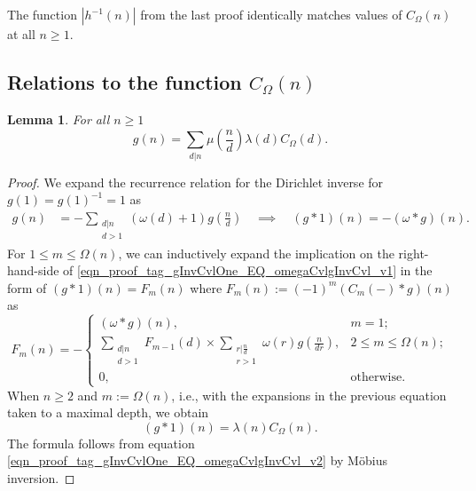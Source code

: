 \documentclass[11pt,reqno,a4letter]{article}
\numberwithin{equation}{section}
\numberwithin{figure}{section}
\numberwithin{table}{section}
\theoremstyle{plain}
\newtheorem{lemma}[theorem]{Lemma}
\numberwithin{theorem}{section}
\theoremstyle{definition}
\begin{document}
The function $|h^{-1}(n)|$ from the last proof identically matches  
values of $C_{\Omega}(n)$ at all $n \geq 1$. 

\subsection{Relations to the function $C_{\Omega}(n)$} 
\label{Section_InvFunc_PreciseExpsAndAsymptotics} 
\label{subSection_Relating_CknFuncs_to_gInvn} 

\begin{lemma} 
\label{lemma_AnExactFormulaFor_gInvByMobiusInv_v1} 
For all $n \geq 1$ 
\[
g(n) = \sum_{d|n} \mu\left(\frac{n}{d}\right) \lambda(d) C_{\Omega}(d). 
\]
\end{lemma}
\begin{proof} 
We expand the recurrence relation for the Dirichlet inverse 
for $g(1) = g(1)^{-1} = 1$ as 
\begin{align} 
\label{eqn_proof_tag_gInvCvlOne_EQ_omegaCvlgInvCvl_v1} 
g(n) & = - \sum_{\substack{d|n \\ d>1}} (\omega(d) + 1) g\left(\frac{n}{d}\right) 
     \quad\implies\quad 
     (g \ast 1)(n) = -(\omega \ast g)(n). 
\end{align} 
For $1 \leq m \leq \Omega(n)$, we can inductively expand the 
implication on the right-hand-side of \eqref{eqn_proof_tag_gInvCvlOne_EQ_omegaCvlgInvCvl_v1} 
in the form of $(g \ast 1)(n) = F_m(n)$ where 
$F_m(n) := (-1)^{m} (C_m(-) \ast g)(n)$ as 
\[
F_m(n) = - 
     \begin{cases} 
     (\omega \ast g)(n), & m = 1; \\ 
     \sum\limits_{\substack{d|n \\ d > 1}} F_{m-1}(d) \times \sum\limits_{\substack{r|\frac{n}{d} \\ r > 1}} 
     \omega(r) g\left(\frac{n}{dr}\right), & 2 \leq m \leq \Omega(n); \\ 
     0, & \text{otherwise.} 
     \end{cases} 
\]
When $n \geq 2$ and $m := \Omega(n)$, i.e., with the expansions 
in the previous equation taken to a maximal depth, we obtain 
\begin{equation} 
\label{eqn_proof_tag_gInvCvlOne_EQ_omegaCvlgInvCvl_v2} 
(g \ast 1)(n) = \lambda(n) C_{\Omega}(n). 
\end{equation} 
The formula follows from equation \eqref{eqn_proof_tag_gInvCvlOne_EQ_omegaCvlgInvCvl_v2} 
by M\"obius inversion. 
\end{proof} 
\end{document}
